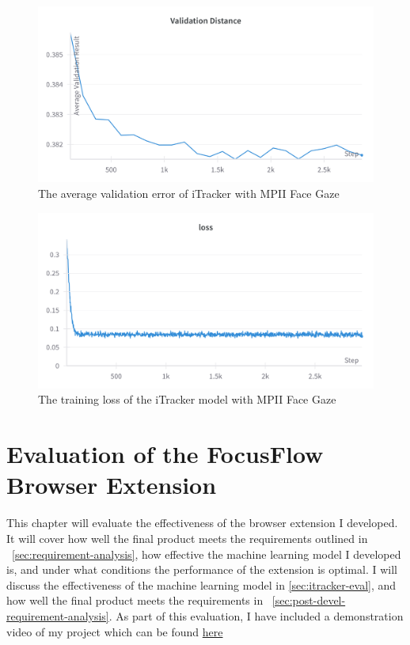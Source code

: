 \documentclass{report}
\begin{document}
\begin{figure}
    \begin{center}
        \includegraphics[scale=0.1]{../assets/Validation Distance.png}
    \end{center}
    \caption{The average validation error of iTracker with MPII Face Gaze}
    \label{fig:loss}
\end{figure}

\begin{figure}
    \begin{center}
        \includegraphics[scale=0.1]{../assets/Training Loss.png}
    \end{center}
    \caption{The training loss of the iTracker model with MPII Face Gaze}
    \label{fig:val}
\end{figure}


\chapter{Evaluation of the FocusFlow Browser Extension}
\label{chap:results}

This chapter will evaluate the effectiveness of the browser extension I developed. It will cover how well the final product meets the requirements outlined in ~\autoref{sec:requirement-analysis}, how effective the machine learning model I developed is, and under what conditions the performance of the extension is optimal. I will discuss the effectiveness of the machine learning model in \autoref{sec:itracker-eval}, and how well the final product meets the requirements in ~\autoref{sec:post-devel-requirement-analysis}. As part of this evaluation, I have included a demonstration video of my project which can be found \href{https://www.youtube.com/watch?v=YR3ODMgqx2k}{here}~\cite{demonstrationVideo}
\end{document}
